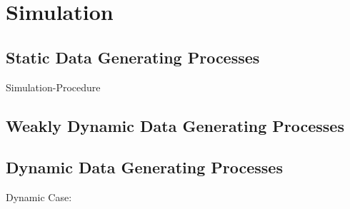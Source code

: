 \section{Simulation}

\subsection{Static Data Generating Processes}

Simulation-Procedure


\subsection{Weakly Dynamic Data Generating Processes}
\subsection{Dynamic Data Generating Processes}
Dynamic Case:
